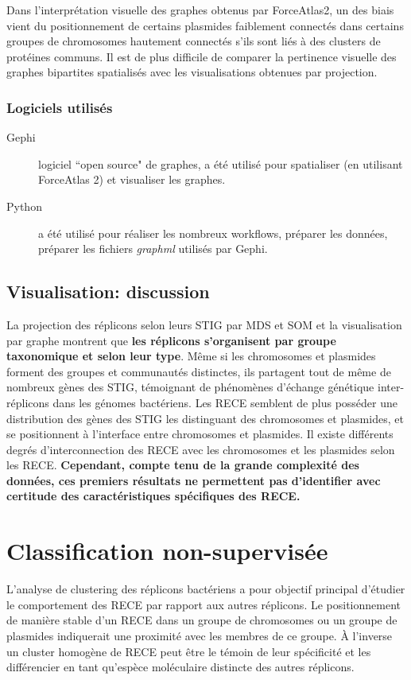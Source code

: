   Dans l'interprétation visuelle des graphes obtenus par ForceAtlas2, un des biais vient du positionnement de certains plasmides faiblement connectés dans certains groupes de chromosomes hautement connectés s'ils sont liés à des clusters de protéines communs. Il est de plus difficile de comparer la pertinence visuelle des graphes bipartites spatialisés avec les visualisations obtenues par projection. 

\subsubsection{Logiciels utilisés}
 \begin{description}
 \item[Gephi] \citep{Bastian2009} logiciel ``open source" de graphes, a été utilisé pour spatialiser (en utilisant ForceAtlas 2) et visualiser les graphes.
 \item[Python] a été utilisé pour réaliser les nombreux workflows, préparer les données, préparer les fichiers \textit{graphml} utilisés par Gephi. 
 \end{description}
 
 
 
\subsection{Visualisation: discussion}

  La projection des réplicons selon leurs STIG par MDS et SOM et la visualisation par graphe montrent que \textbf{\color{orange}les réplicons s'organisent par groupe taxonomique et selon leur type}. Même si les chromosomes et plasmides forment des groupes et communautés distinctes, ils partagent tout de même de nombreux gènes des STIG, témoignant de phénomènes d'échange génétique inter-réplicons dans les génomes bactériens. Les RECE semblent de plus posséder une distribution des gènes des STIG les distinguant des chromosomes et plasmides, et se positionnent à l'interface entre chromosomes et plasmides. Il existe différents degrés d'interconnection des RECE avec les chromosomes et les plasmides selon les RECE. \textbf{Cependant, compte tenu de la grande complexité des données, ces premiers résultats ne permettent pas d'identifier avec certitude des caractéristiques spécifiques des RECE. }
  
  
  
\section{Classification non-supervisée}\label{parclassifnonsupervis}
      L'analyse de clustering des réplicons bactériens a pour objectif principal d'étudier le comportement des RECE par rapport aux autres réplicons. Le positionnement de manière stable d'un RECE dans un groupe de chromosomes ou un groupe de plasmides indiquerait une proximité avec les membres de ce groupe. À l'inverse un cluster homogène de RECE peut être le témoin de leur spécificité et les différencier en tant qu'espèce moléculaire distincte des autres réplicons. 
      
